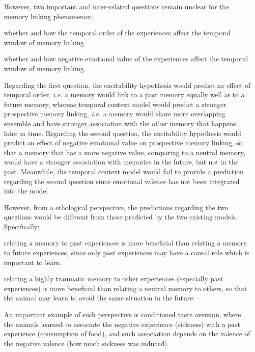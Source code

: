 \documentclass[master.tex]{subfiles}
\begin{document}
However, two important and inter-related questions remain unclear for the
memory linking phenomenon:
\begin{inparaenum}[a)] \bfseries
\item whether and how the temporal order of the experiences affect the temporal
  window of memory linking.
\item whether and how negative emotional value of the experiences affect the
  temporal window of memory linking.
\end{inparaenum}
Regarding the first question, the excitability hypothesis would predict no
effect of temporal order, \textit{i.e.} a memory would link to a past memory
equally well as to a future memory, whereas temporal context model would predict
a stronger prospective memory linking, \textit{i.e.} a memory would share more
overlapping ensemble and have stronger association with the other memory that
happens later in time. Regarding the second question, the excitability
hypothesis would predict an effect of negative emotional value on prospective
memory linking, so that a memory that has a more negative value, comparing to a
neutral memory, would have a stronger association with memories in the future,
but not in the past. Meanwhile, the temporal context model would fail to provide
a prediction regarding the second question since emotional valence has not been
integrated into the model.

However, from a ethological perspective, the predictions regarding the two
questions would be different from those predicted by the two existing models.
Specifically:
\begin{inparaenum}[a)]
\item relating a memory to past experiences is more beneficial than relating a
  memory to future experiences, since only past experiences may have a causal
  role which is important to learn.
\item relating a highly traumatic memory to other experiences (especially past
  experiences) is more beneficial than relating a neutral memory to others, so
  that the animal may learn to avoid the same situation in the future.
\end{inparaenum}
An important example of such perspective is conditioned taste aversion, where
the animals learned to associate the negative experience (sickness) with a past
experience (consumption of food), and such association depends on the valence of
the negative valence (how much sickness was induced).
\end{document}
